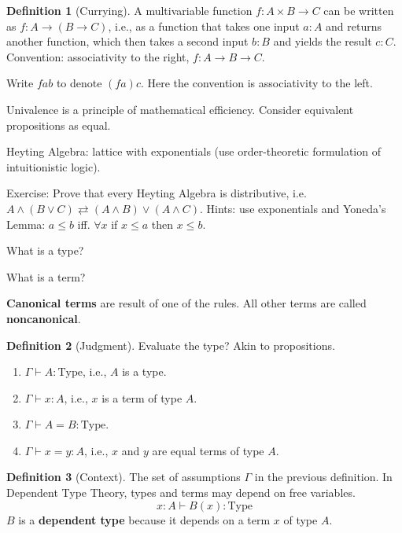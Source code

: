 \documentclass[12pt,a4paper]{article}
\theoremstyle{definition}
\newtheorem{definition}{Definition}[section]
\begin{document}
\begin{definition}[Currying]
    A multivariable function $f : A \times B \longrightarrow C$ can be written as $f : A \longrightarrow (B \longrightarrow C)$, i.e., as a function that takes one input $a : A$ and returns another function, which then takes a second input $b : B$ and yields the result $c : C$. Convention: associativity to the right, $f : A \longrightarrow B \longrightarrow C$.
\end{definition}

Write $f a b$ to denote $(f a) c$. Here the convention is associativity to the left.

Univalence is a principle of mathematical efficiency. Consider equivalent propositions as equal.

Heyting Algebra: lattice with exponentials (use order-theoretic formulation of intuitionistic logic). 

Exercise: Prove that every Heyting Algebra is distributive, i.e. $A \land (B \lor C) \rightleftarrows (A \land B) \lor (A \land C)$. Hints: use exponentials and Yoneda's Lemma: $a \leq b$ iff. $\forall x$ if $x \leq a$ then $x \leq b$.


What is a type?

What is a term?

\textbf{Canonical terms} are result of one of the rules. All other terms are called \textbf{noncanonical}.

\begin{definition}[Judgment]
    Evaluate the type? Akin to propositions. 
    \begin{enumerate}
        \item $\Gamma \vdash A : \text{Type}$, i.e., $A$ is a type.
        \item $\Gamma \vdash x : A$, i.e., $x$ is a term of type $A$.
        \item $\Gamma \vdash A = B : \text{Type}$.
        \item $\Gamma \vdash x = y : A$, i.e., $x$ and $y$ are equal terms of type $A$.
    \end{enumerate}
\end{definition}

\begin{definition}[Context]
    The set of assumptions $\Gamma$ in the previous definition. In Dependent Type Theory, types and terms may depend on free variables. 
    \[ x : A \vdash B(x) : \text{Type} \]
    $B$ is a \textbf{dependent type} because it depends on a term $x$ of type $A$. 
\end{definition}
\end{document}
